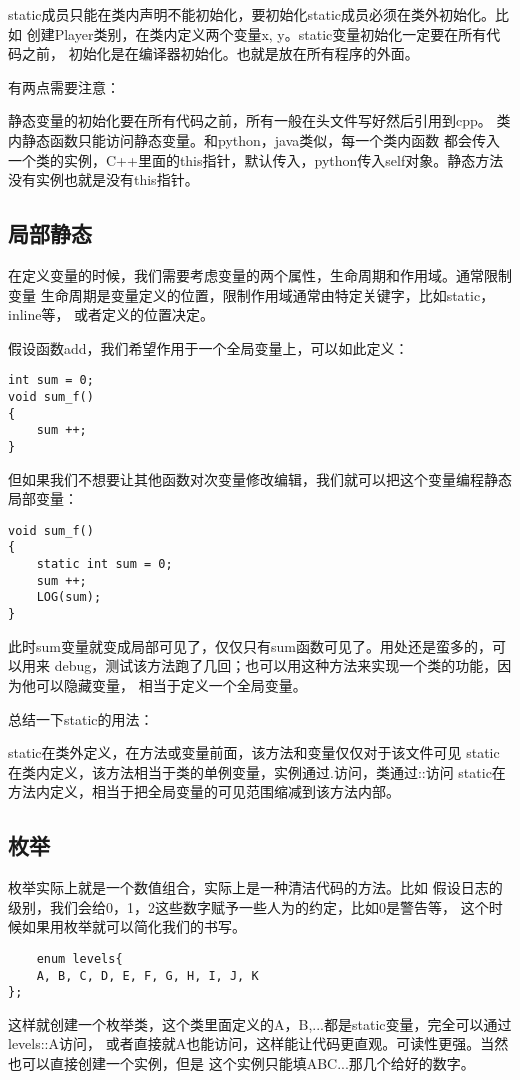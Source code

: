 \documentclass{article}
\begin{document}
\begin{sloppypar}
static成员只能在类内声明不能初始化，要初始化static成员必须在类外初始化。比如
创建Player类别，在类内定义两个变量x, y。static变量初始化一定要在所有代码之前，
初始化是在编译器初始化。也就是放在所有程序的外面。

有两点需要注意：
\begin{outline}
	\1 静态变量的初始化要在所有代码之前，所有一般在头文件写好然后引用到cpp。
	\1 类内静态函数只能访问静态变量。和python，java类似，每一个类内函数
	都会传入一个类的实例，C++里面的this指针，默认传入，python传入self对象。静态方法
	没有实例也就是没有this指针。
\end{outline}

\subsection{局部静态}
在定义变量的时候，我们需要考虑变量的两个属性，生命周期和作用域。通常限制变量
生命周期是变量定义的位置，限制作用域通常由特定关键字，比如static， inline等，
或者定义的位置决定。

假设函数add，我们希望作用于一个全局变量上，可以如此定义：
\begin{lstlisting}
int sum = 0;
void sum_f()
{
    sum ++;
}
\end{lstlisting}
但如果我们不想要让其他函数对次变量修改编辑，我们就可以把这个变量编程静态局部变量：
\begin{lstlisting}
void sum_f()
{
    static int sum = 0;
    sum ++;
    LOG(sum);
}
\end{lstlisting}
此时sum变量就变成局部可见了，仅仅只有sum函数可见了。用处还是蛮多的，可以用来
debug，测试该方法跑了几回；也可以用这种方法来实现一个类的功能，因为他可以隐藏变量，
相当于定义一个全局变量。

总结一下static的用法：
\begin{outline}
	\1 static在类外定义，在方法或变量前面，该方法和变量仅仅对于该文件可见
	\1 static在类内定义，该方法相当于类的单例变量，实例通过.访问，类通过::访问
	\1 static在方法内定义，相当于把全局变量的可见范围缩减到该方法内部。
\end{outline}

\subsection{枚举}
枚举实际上就是一个数值组合，实际上是一种清洁代码的方法。比如
假设日志的级别，我们会给0，1，2这些数字赋予一些人为的约定，比如0是警告等，
这个时候如果用枚举就可以简化我们的书写。
\begin{lstlisting}
	enum levels{
    A, B, C, D, E, F, G, H, I, J, K
};
\end{lstlisting}
这样就创建一个枚举类，这个类里面定义的A，B,...都是static变量，完全可以通过levels::A访问，
或者直接就A也能访问，这样能让代码更直观。可读性更强。当然也可以直接创建一个实例，但是
这个实例只能填ABC...那几个给好的数字。


\end{sloppypar}
\end{document}
